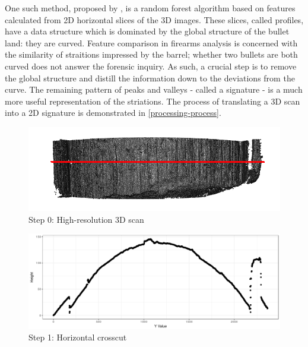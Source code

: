 \documentclass[12pt]{article}
\begin{document}
One such method, proposed by \citet{Hare1}, is a random forest algorithm
based on features calculated from 2D horizontal slices of the 3D images.
These slices, called profiles, have a data structure which is dominated
by the global structure of the bullet land: they are curved. Feature
comparison in firearms analysis is concerned with the similarity of
straitions impressed by the barrel; whether two bullets are both curved
does not answer the forensic inquiry. As such, a crucial step is to
remove the global structure and distill the information down to the
deviations from the curve. The remaining pattern of peaks and valleys -
called a signature - is a much more useful representation of the
striations. The process of translating a 3D scan into a 2D signature is
demonstrated in \autoref{processing-process}.

\begin{figure}
\begin{minipage}[b]{0.45\linewidth}
    \raggedleft
    \includegraphics[width=\textwidth]{../images/3d_plot_top_crosscut.png}
    \centering
    Step 0: High-resolution 3D scan
\end{minipage}
\hspace{.2cm}
\begin{minipage}[b]{0.45\linewidth}
    \raggedright
    \includegraphics[width=\textwidth]{../images/Profile_1.png}
    \centering
    Step 1: Horizontal crosscut
\end{minipage}
\vspace{.6cm}


\end{figure}
\end{document}
